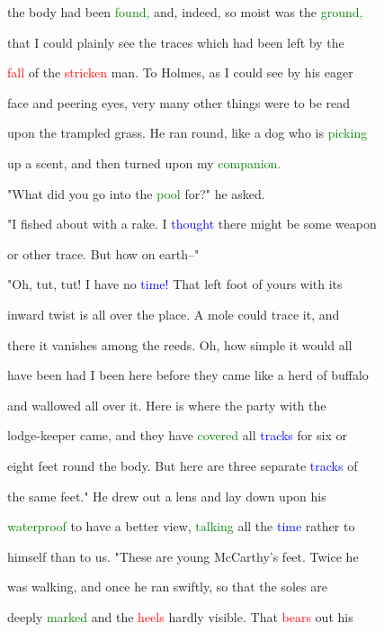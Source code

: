  the body had been \textcolor{green}{found,} and, indeed, so moist was the \textcolor{green}{ground,}

 that I could plainly see the traces which had been left by the

 \textcolor{red}{fall} of the \textcolor{red}{stricken} man. To Holmes, as I could see by his \textcolor{BurntOrange}{eager}

 face and peering eyes, very many other things were to be read

 upon the trampled grass. He ran round, like a dog who is \textcolor{green}{picking}

 up a scent, and then turned upon my \textcolor{green}{companion.}



 "What did you go into the \textcolor{green}{pool} for?" he asked.



 "I fished about with a rake. I \textcolor{blue}{thought} there might be some weapon

 or other trace. But how on earth--"



 "Oh, tut, tut! I have no \textcolor{blue}{time!} That left foot of yours with its

 inward twist is all over the place. A mole could trace it, and

 there it vanishes among the reeds. Oh, how simple it would all

 have been had I been here before they came like a herd of buffalo

 and wallowed all over it. Here is where the party with the

 lodge-keeper came, and they have \textcolor{green}{covered} all \textcolor{blue}{tracks} for six or

 eight feet round the body. But here are three separate \textcolor{blue}{tracks} of

 the same feet." He drew out a lens and lay down upon his

 \textcolor{green}{waterproof} to have a better view, \textcolor{green}{talking} all the \textcolor{blue}{time} rather to

 himself than to us. "These are \textcolor{BurntOrange}{young} McCarthy's feet. Twice he

 was walking, and once he ran swiftly, so that the soles are

 deeply \textcolor{green}{marked} and the \textcolor{red}{heels} hardly visible. That \textcolor{red}{bears} out his

